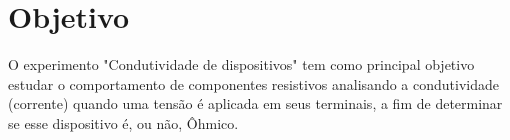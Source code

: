 \section{Objetivo}
    O experimento "Condutividade de dispositivos"  tem como principal objetivo estudar o comportamento de componentes
    resistivos analisando a condutividade (corrente) quando uma tensão é aplicada em seus terminais, a fim de determinar
    se esse dispositivo é, ou não, Ôhmico.
